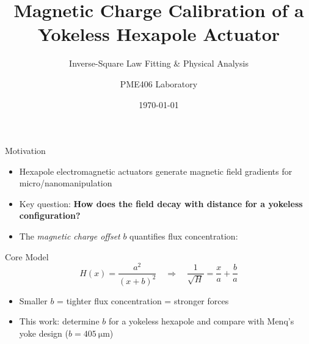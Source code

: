 \documentclass[aspectratio=169,11pt]{beamer}
\title[Charge Calibration]{Magnetic Charge Calibration of a\\
Yokeless Hexapole Actuator}
\subtitle{Inverse-Square Law Fitting \& Physical Analysis}
\author{PME406 Laboratory}
\institute{Department of Mechanical Engineering\\
National Taiwan University}
\date{\today}
\begin{document}
\begin{frame}
\titlepage
\end{frame}

\begin{frame}{Motivation}
\begin{itemize}
\item Hexapole electromagnetic actuators generate magnetic field gradients
      for micro/nanomanipulation
\item Key question: \textbf{How does the field decay with distance for a
      yokeless configuration?}
\item The \emph{magnetic charge offset} $b$ quantifies flux concentration:
\end{itemize}

\vspace{0.5em}
\begin{block}{Core Model}
\[
H(x) = \frac{a^2}{(x + b)^2}
\quad\Longrightarrow\quad
\frac{1}{\sqrt{H}} = \frac{x}{a} + \frac{b}{a}
\]
\end{block}

\vspace{0.5em}
\begin{itemize}
\item Smaller $b$ = tighter flux concentration = stronger forces
\item This work: determine $b$ for a yokeless hexapole and compare with
      Menq's yoke design ($b = \SI{405}{\um}$)
\end{itemize}
\end{frame}
\end{document}
